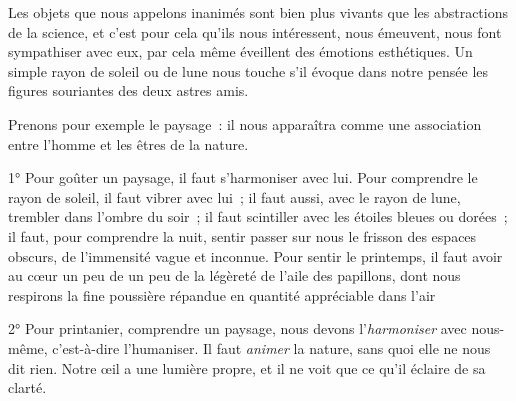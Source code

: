 \documentclass[french,twoside]{book} %
\begin{document}
Les objets que nous appelons inanimés sont bien plus vivants que les abstractions de la science, et c’est pour cela qu’ils nous intéressent, nous émeuvent, nous font sympathiser avec eux, par cela même éveillent des émotions esthétiques. Un simple rayon de soleil ou de lune nous touche s’il évoque dans notre pensée les figures souriantes des deux astres amis.\par
Prenons pour exemple le paysage : il nous apparaîtra comme une association entre l’homme et les êtres de la nature.\par
1° Pour goûter un paysage, il faut s’harmoniser avec lui. Pour comprendre le rayon de soleil, il faut vibrer avec lui ; il faut aussi, avec le rayon de lune, trembler dans l’ombre du soir ; il faut scintiller avec les étoiles bleues ou dorées ; il faut, pour comprendre la nuit, sentir passer sur nous le frisson des espaces obscurs, de l’immensité vague et inconnue. Pour sentir le printemps, il faut avoir au cœur un peu de un peu de la légèreté de l’aile des papillons, dont nous respirons la fine poussière répandue en quantité appréciable dans l’air\par
2° Pour printanier, comprendre un paysage, nous devons l’\emph{harmoniser} avec nous-même, c’est-à-dire l’humaniser. Il faut \emph{animer} la nature, sans quoi elle ne nous dit rien. Notre œil a une lumière propre, et il ne voit que ce qu’il éclaire de sa clarté.\par
\end{document}
